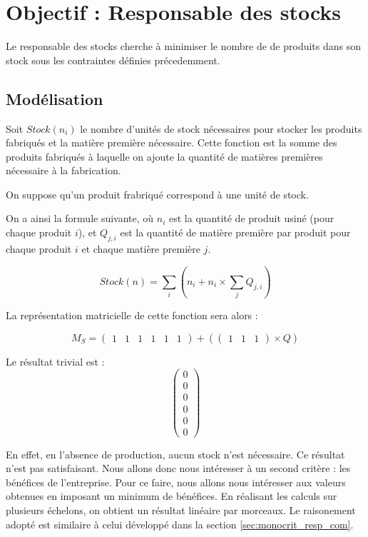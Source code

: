 \newpage
\section{Objectif : Responsable des stocks}
Le responsable des stocks cherche à minimiser le nombre de de produits dans
son stock sous les contraintes définies précedemment.

\subsection{Modélisation}
Soit $Stock(n_{i})$ le nombre d'unités de stock nécessaires pour stocker les
produits fabriqués et la matière première nécessaire. Cette fonction est la
somme des produits fabriqués à laquelle on ajoute la quantité de matières
premières nécessaire à la fabrication.

On suppose qu'un produit frabriqué correspond à une unité de stock.

On a ainsi la formule suivante, où $n_{i}$ est la quantité de produit usiné
(pour chaque produit $i$), et $Q_{j,i}$ est la quantité de matière première
par produit pour chaque produit $i$ et chaque matière première $j$.

\begin{equation}
	Stock(n) = \sum_{i} (n_{i} + n_{i} \times \sum_{j} Q_{j,i})
\end{equation}

La représentation matricielle de cette fonction sera alors :

\begin{equation}
	M_S = \begin{pmatrix}
		1 & 1 & 1 & 1 & 1 & 1
	\end{pmatrix} + (
	\begin{pmatrix}
		1 & 1 & 1
	\end{pmatrix}
	\times Q)
\end{equation}

Le résultat trivial est :
\begin{equation}
    \begin{pmatrix}
	0 \\ 0 \\ 0 \\ 0 \\ 0 \\ 0
    \end{pmatrix}
\end{equation}

En effet, en l'absence de production, aucun stock n'est nécessaire. Ce résultat
n'est pas satisfaisant. Nous allons donc nous intéresser à un second critère :
les bénéfices de l'entreprise. Pour ce faire, nous allons nous intéresser aux
valeurs obtenues en imposant un minimum de bénéfices. En réalisant les calculs
sur plusieurs échelons, on obtient un résultat linéaire par morceaux. Le
raisonement adopté est similaire à celui développé dans la section
\ref{sec:monocrit_resp_com}.

